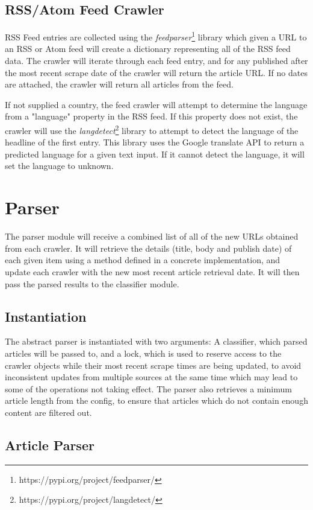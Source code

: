 \documentclass{l4proj}
\begin{document}
\subsection{RSS/Atom Feed Crawler}
RSS Feed entries are collected using the \emph{feedparser}\footnote{https://pypi.org/project/feedparser/} library which given a URL to an RSS or Atom feed will create a dictionary representing all of the RSS feed data. The crawler will iterate through each feed entry, and for any published after the most recent scrape date of the crawler will return the article URL. If no dates are attached, the crawler will return all articles from the feed. \par
If not supplied a country, the feed crawler will attempt to determine the language from a "language" property in the RSS feed. If this property does not exist, the crawler will use the \emph{langdetect}\footnote{https://pypi.org/project/langdetect/} library to attempt to detect the language of the headline of the first entry. This library uses the Google translate API to return a predicted language for a given text input. If it cannot detect the language, it will set the language to unknown.


\section{Parser}
The parser module will receive a combined list of all of the new URLs obtained from each crawler. It will retrieve the details (title, body and publish date) of each given item using a method defined in a concrete implementation, and update each crawler with the new most recent article retrieval date. It will then pass the parsed results to the classifier module.
\subsection{Instantiation}
The abstract parser is instantiated with two arguments: A classifier, which parsed articles will be passed to, and a lock, which is used to reserve access to the crawler objects while their most recent scrape times are being updated, to avoid inconsistent updates from multiple sources at the same time which may lead to some of the operations not taking effect. The parser also retrieves a minimum article length from the config, to ensure that articles which do not contain enough content are filtered out.
\subsection{Article Parser}
\end{document}
